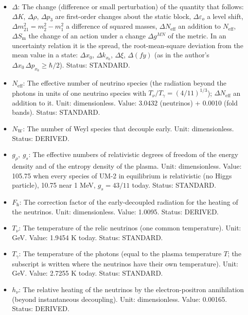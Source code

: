 \documentclass[
  10pt,
]{article}
\providecommand{\tightlist}{%
  \setlength{\itemsep}{0pt}\setlength{\parskip}{0pt}}
\begin{document}
\begin{itemize}
\tightlist
\item
  \(\Delta\): The change (difference or small perturbation) of the
  quantity that follows: \(\Delta K\), \(\Delta\rho\), \(\Delta p_3\)
  are first-order changes about the static block,
  \(\Delta\varepsilon_o\) a level shift,
  \(\Delta m^2_{21} = m_2^2 - m_1^2\) a difference of squared masses,
  \(\Delta N_{\mathrm{eff}}\) an addition to \(N_{\mathrm{eff}}\),
  \(\Delta S_{\mathrm{m}}\) the change of an action under a change
  \(\Delta g^{MN}\) of the metric. In an uncertainty relation it is the
  spread, the root-mean-square deviation from the mean value in a state:
  \(\Delta x_0\), \(\Delta k_{x_0}\), \(\Delta\xi\), \(\Delta(fy)\) (as
  in the author's \(\Delta x_0\,\Delta p_{x_0} \ge \hbar/2\)). Status:
  STANDARD.
\item
  \(N_{\mathrm{eff}}\): The effective number of neutrino species (the
  radiation beyond the photons in units of one neutrino species with
  \(T_\nu/T_\gamma = (4/11)^{1/3}\)); \(\Delta N_{\mathrm{eff}}\) an
  addition to it. Unit: dimensionless. Value: 3.0432 (neutrinos) +
  0.0010 (fold bands). Status: STANDARD.
\item
  \(N_{\mathrm{W}}\): The number of Weyl species that decouple early.
  Unit: dimensionless. Status: DERIVED.
\item
  \(g_\rho,\ g_s\): The effective numbers of relativistic degrees of
  freedom of the energy density and of the entropy density of the
  plasma. Unit: dimensionless. Value: 105.75 when every species of UM-2
  in equilibrium is relativistic (no Higgs particle), 10.75 near 1 MeV,
  \(g_s = 43/11\) today. Status: STANDARD.
\item
  \(F_{\mathrm{h}}\): The correction factor of the early-decoupled
  radiation for the heating of the neutrinos. Unit: dimensionless.
  Value: 1.0095. Status: DERIVED.
\item
  \(T_\nu\): The temperature of the relic neutrinos (one common
  temperature). Unit: GeV. Value: 1.9454 K today. Status: STANDARD.
\item
  \(T_\gamma\): The temperature of the photons (equal to the plasma
  temperature \(T\); the subscript is written where the neutrinos have
  their own temperature). Unit: GeV. Value: 2.7255 K today. Status:
  STANDARD.
\item
  \(h_\nu\): The relative heating of the neutrinos by the
  electron-positron annihilation (beyond instantaneous decoupling).
  Unit: dimensionless. Value: 0.00165. Status: DERIVED.
\end{itemize}
\end{document}
